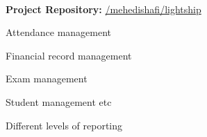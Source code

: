  \\

\vspace{\topsep}
{\bf Project Repository: }\href{https://github.com/mehedi-shafi/lightship}{\github/mehedishafi/lightship}
\vspace{\topsep}

\begin{tightitemize}

\item Attendance management
\item Financial record management
\item Exam management
\item Student management etc
\item Different levels of reporting

\end{tightitemize}

\sectionspace